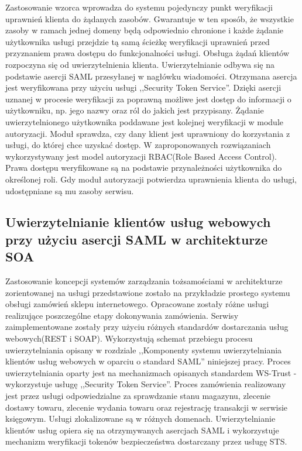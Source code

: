 		Zastosowanie wzorca wprowadza do systemu pojedynczy punkt weryfikacji uprawnień klienta do żądanych zasobów. Gwarantuje w ten sposób, że wszystkie zasoby w ramach jednej domeny będą odpowiednio chronione i każde żądanie użytkownika usługi przejdzie tą samą ścieżkę weryfikacji uprawnień przed przyznaniem prawa dostępu do funkcjonalności usługi. Obsługa żądań klientów rozpoczyna się od uwierzytelnienia klienta. Uwierzytelnianie odbywa się na podstawie asercji SAML przesyłanej w nagłówku wiadomości. Otrzymana asercja jest weryfikowana przy użyciu usługi ,,Security Token Service''. Dzięki asercji uznanej w procesie weryfikacji za poprawną możliwe jest dostęp do informacji o użytkowniku, np. jego nazwy oraz ról do jakich jest przypisany. Żądanie uwierzytelnionego użytkownika poddawane jest kolejnej weryfikacji w module autoryzacji. Moduł sprawdza, czy dany klient jest uprawniony do korzystania z usługi, do której chce uzyskać dostęp. W zaproponowanych rozwiązaniach wykorzystywany jest model autoryzacji RBAC(Role Based Access Control). Prawa dostępu weryfikowane są na podstawie przynależności użytkownika do określonej roli. Gdy moduł autoryzacji potwierdza uprawnienia klienta do usługi, udostępniane są mu zasoby serwisu.

	\subsection{Uwierzytelnianie klientów usług webowych przy użyciu asercji SAML w architekturze SOA}


		Zastosowanie koncepcji systemów zarządzania tożsamościami w architekturze zorientowanej na usługi przedstawione zostało na przykładzie prostego systemu obsługi zamówień sklepu internetowego. Opracowane zostały różne usługi realizujące poszczególne etapy dokonywania zamówienia. Serwisy zaimplementowane zostały przy użyciu różnych standardów dostarczania usług webowych(REST i SOAP). Wykorzystują schemat przebiegu procesu uwierzytelniania opisany w rozdziale ,,Komponenty systemu uwierzytelniania klientów usług webowych w oparciu o standard SAML'' niniejszej pracy. Proces uwierzytelniania oparty jest na mechanizmach opisanych standardem WS-Trust - wykorzystuje usługę ,,Security Token Service''. Proces zamówienia realizowany jest przez usługi odpowiedzialne za sprawdzanie stanu magazynu, zlecenie dostawy towaru, zlecenie wydania towaru  oraz rejestrację transakcji w serwisie księgowym. Usługi zlokalizowane są w różnych domenach. Uwierzytelnianie klientów usług opiera się na otrzymywanych asercjach SAML i wykorzystuje mechanizm weryfikacji tokenów bezpieczeństwa dostarczany przez usługę STS. 

